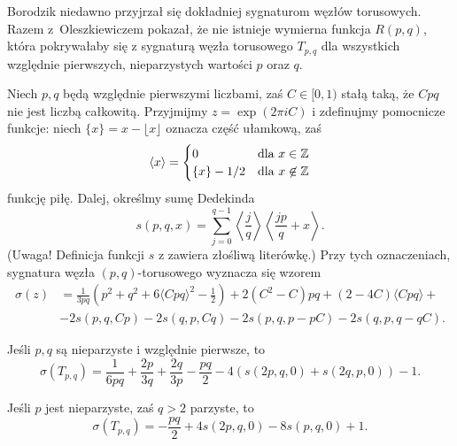 Borodzik niedawno przyjrzał się dokładniej sygnaturom węzłów torusowych.
%
Razem z~Oleszkiewiczem \cite{borodzik10} pokazał, że nie istnieje wymierna funkcja $R(p, q)$, która pokrywałaby się z sygnaturą węzła torusowego $T_{p, q}$ dla wszystkich względnie pierwszych, nieparzystych wartości $p$ oraz $q$.
%

\begin{proposition}
    Niech $p, q$ będą względnie pierwszymi liczbami, zaś $C \in [0, 1)$ stałą taką, że $Cpq$ nie jest liczbą całkowitą.
    Przyjmijmy $z = \exp (2 \pi i C)$ i zdefinujmy pomocnicze funkcje: niech $\{x\} = x - \lfloor x \rfloor$ oznacza część ułamkową, zaś
    \begin{equation}
        \langle x \rangle = \begin{cases}
            0 & \text{dla } x \in \mathbb Z \\
            \{x\} - 1/2 & \text{dla } x \not \in \mathbb Z
        \end{cases}
    \end{equation}
    funkcję piłę.
    Dalej, określmy sumę Dedekinda
    \begin{equation}
        s(p, q, x) = \sum_{j = 0}^{q-1} \left\langle \frac {j}{q} \right\rangle \left\langle \frac {jp}{q} + x \right\rangle.
    \end{equation}
    (Uwaga! Definicja funkcji $s$ z \cite{borodzik10} zawiera złośliwą literówkę.)
    Przy tych oznaczeniach, sygnatura węzła $(p, q)$-torusowego wyznacza się wzorem
    \begin{align}
        \sigma(z) & = \frac{1}{3pq} \left(p^2 + q^2 + 6 \langle Cpq \rangle^2 - \frac {1}{2} \right)  + 2(C^2 - C) pq + (2-4C) \langle Cpq \rangle + {} \\
        & - 2s(p, q, Cp) - 2s(q, p, Cq) - 2s(p, q, p-pC) - 2s(q, p, q-qC). \nonumber
    \end{align}
\end{proposition}

\begin{corollary}
    Jeśli $p, q$ są nieparzyste i względnie pierwsze, to
    \begin{equation}
        \sigma(T_{p,q}) = \frac{1}{6pq} + \frac{2p}{3q} + \frac{2q}{3p} - \frac{pq}{2} - 4(s(2p, q, 0) + s(2q, p, 0)) - 1.
    \end{equation}
\end{corollary}

\begin{corollary}
    Jeśli $p$ jest nieparzyste, zaś $q > 2$ parzyste, to
    \begin{equation}
        \sigma(T_{p,q}) = - \frac{pq}{2} + 4s(2p, q, 0) - 8s(p, q, 0) + 1.
    \end{equation}
\end{corollary}

